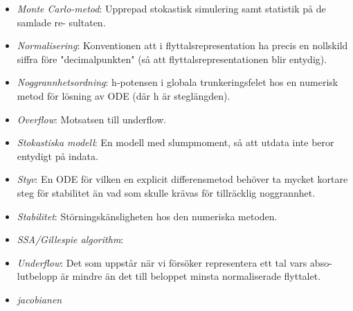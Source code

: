 \begin{multicols}{2}
\begin{itemize}
  \item \textit{Monte Carlo-metod}: Upprepad stokastisk simulering samt statistik på de samlade re-
sultaten.
  \item \textit{Normalisering}: Konventionen att i flyttalsrepresentation ha precis en nollskild
siﬀra före "decimalpunkten" (så att flyttalsrepresentationen blir
entydig).
  \item \textit{Noggrannhetsordning}: h-potensen i globala trunkeringsfelet hos en numerisk metod för
lösning av ODE (där h är steglängden).
  \item \textit{Overflow}: Motsatsen till underflow.
  \item \textit{Stokastiska modell}: En modell med slumpmoment, så att utdata inte beror entydigt
på indata.
 \item \textit{Styv}: En ODE för vilken en explicit diﬀerensmetod behöver ta mycket
kortare steg för stabilitet än vad som skulle krävas för tillräcklig
noggrannhet.
  \item \textit{Stabilitet}: Störningskänsligheten hos den numeriska metoden.
  \item \textit{SSA/Gillespie algorithm}:
  \item \textit{Underflow}: Det som uppstår när vi försöker representera ett tal vars abso-
lutbelopp är mindre än det till beloppet minsta normaliserade
flyttalet.
  \item \textit{jacobianen}
\end{itemize}
\end{multicols}
\raggedcolumns